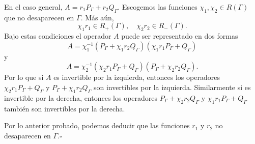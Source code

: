 \documentclass[11pt]{beamer}
\begin{document}
\begin{frame}[shrink]
\begin{block}

En el caso general, $A=r_{1}P_{\Gamma}+r_{2}Q_{\Gamma}$. Escogemos las funciones $\chi_{1},\chi_{2}\in R(\Gamma)$ que no desaparecen en $\Gamma$. Más aún,
\[\chi_{1}r_{1}\in R_{+}(\Gamma),\quad \chi_{2}r_{2}\in R_{-}(\Gamma).\] Bajo estas condiciones el operador $A$ puede ser representado en dos formas \[A=\chi_{1}^{-1}(P_{\Gamma}+\chi_{1}r_{2}Q_{\Gamma})(\chi_{1}r_{1}P_{\Gamma}+Q_{\Gamma})\] y \[A=\chi_{2}^{-1}(\chi_{2}r_{1}P_{\Gamma}+Q_{\Gamma})(P_{\Gamma}+\chi_{2}r_{2}Q_{\Gamma}).\] Por lo que si $A$ es invertible por la izquierda, entonces los operadores $\chi_{2}r_{1}P_{\Gamma}+Q_{\Gamma}$ y $P_{\Gamma}+\chi_{1}r_{2}Q_{\Gamma}$ son invertibles por la izquierda. Similarmente si es invertible por la derecha, entonces los operadores $P_{\Gamma}+\chi_{2}r_{2}Q_{\Gamma}$ y $\chi_{1}r_{1}P_{\Gamma}+Q_{\Gamma}$ también son invertibles por la derecha.\

Por lo anterior probado, podemos deducir que las funciones $r_{1}$ y $r_{2}$ no desaparecen en $\Gamma$.\qquad\qquad\qquad\qquad\qquad\qquad\qquad\qquad$\square$
\end{block}
\end{frame}
\end{document}
